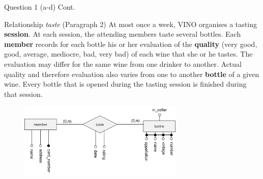 \begin{frame}[fragile]{Question 1 (a-d) Cont.}
\begin{exampleblock}{Relationship \textit{taste} (Paragraph 2)}
	At most once a week, VINO organises a tasting \textbf{session}. At each session, the attending members taste several	bottles. Each \textbf{member} records for each bottle his or her evaluation of the \textbf{quality} (very good, good, average, mediocre, bad, very bad) of each wine that she or he tastes. The evaluation may differ for the same wine from one drinker to another. Actual quality and therefore evaluation also varies from one to another \textbf{bottle} of a given wine. Every bottle that is opened during the tasting session is finished during that session.
\end{exampleblock}

\begin{figure}
	\includegraphics[width=0.7\textwidth]{t4/images/taste_relationship.png}
\end{figure}
\end{frame}

